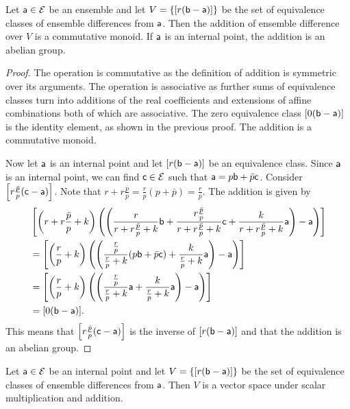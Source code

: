 \begin{mathSection}
	\begin{coro}
		Let $\ens[a] \in \Ens$ be an ensemble and let $V = \{ [r(\ens[b]-\ens[a])] \}$ be the set of equivalence classes of ensemble differences from $\ens[a]$. Then the addition of ensemble difference over $V$ is a commutative monoid. If $\ens[a]$ is an internal point, the addition is an abelian group.
	\end{coro}
	
	\begin{proof}
		The operation is commutative as the definition of addition is symmetric over its arguments. The operation is associative as further sums of equivalence classes turn into additions of the real coefficients and extensions of affine combinations both of which are associative. The zero equivalence class $[0(\ens[b] - \ens[a])]$ is the identity element, as shown in the previous proof. The addition is a commutative monoid.
		
		Now let $\ens[a]$ is an internal point and let $[r(\ens[b] - \ens[a])]$ be an equivalence class. Since $\ens[a]$ is an internal point, we can find $\ens[c] \in \Ens$ such that $\ens[a] = p \ens[b] + \bar{p} \ens[c]$. Consider $\left[r\frac{\bar{p}}{p}(\ens[c] - \ens[a])\right]$. Note that $r + r\frac{\bar{p}}{p} = \frac{r}{p}(p+\bar{p}) = \frac{r}{p}$. The addition is given by
		\begin{equation}
			\begin{aligned}
				&\left[\left(r+r\frac{\bar{p}}{p}+k\right) \left(\left(\frac{r}{r+r\frac{\bar{p}}{p}+k}\ens[b] + \frac{r\frac{\bar{p}}{p}}{r+r\frac{\bar{p}}{p}+k} \ens[c] +\frac{k}{r+r\frac{\bar{p}}{p}+k} \ens[a] \right) - \ens[a]\right)\right] \\
				&=\left[\left(\frac{r}{p}+k\right) \left(\left(\frac{\frac{r}{p}}{\frac{r}{p}+k}(p\ens[b] + \bar{p} \ens[c]) +\frac{k}{\frac{r}{p}+k} \ens[a] \right) - \ens[a]\right)\right] \\
				&=\left[\left(\frac{r}{p}+k\right) \left(\left(\frac{\frac{r}{p}}{\frac{r}{p}+k}\ens[a] +\frac{k}{\frac{r}{p}+k} \ens[a] \right) - \ens[a]\right)\right] \\
				&= [0(\ens[b] - \ens[a])].
			\end{aligned}
		\end{equation}
		This means that $\left[r\frac{\bar{p}}{p}(\ens[c] - \ens[a])\right]$ is the inverse of $[r(\ens[b] - \ens[a])]$ and that the addition is an abelian group.
	\end{proof}
	
	\begin{thrm}
		Let $\ens[a] \in \Ens$ be an internal point and let $V = \{ [r(\ens[b]-\ens[a])] \}$ be the set of equivalence classes of ensemble differences from $\ens[a]$. Then $V$ is a vector space under scalar multiplication and addition.
	\end{thrm}
	

\end{mathSection}
